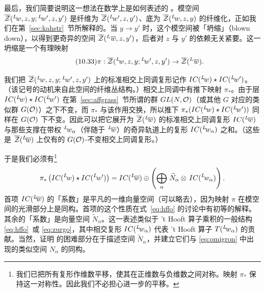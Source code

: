 最后，我们简要说明这一想法在数学上是如何表述的 \cite{ref97,ref98}。模空间 $\bar\EUZ({}^L\negthinspace w,z,y;{}^L\negthinspace w',z,y')$ 是纤维为 $\bar\EUZ ({}^L\negthinspace w',z,y')$、底为 $\bar\EUZ({}^L\negthinspace w,z,y)$ 的纤维化，正如我们在第~\ref{sec:kahstr}~节所解释的。当 $y\to y'$ 时，这个模空间被「坍缩」（blown down），以得到更奇异的空间 $\bar\EUZ({}^L\negthinspace\,\bar w,z,y')$，后者对 $z$ 与 $y'$ 的依赖无关紧要。这一坍缩是一个有理映射
\begin{equation*}
\tag*{(10.33)}
\pi:\bar\EUZ({}^L\negthinspace w,z,y;{}^L\negthinspace
w',z,y')\to \bar\EUZ({}^L\negthinspace\,\bar w).
\end{equation*}

我们把 $\bar\EUZ({}^L\negthinspace w,z,y;{}^L\negthinspace w',z,y')$ 上的标准相交上同调复形记作 $IC({}^L\negthinspace w)\star IC({}^L\negthinspace w')$。（该记号的动机来自此空间的纤维丛结构。）相交上同调中有推下映射 $\pi_*$。由于层 $IC({}^L\negthinspace w)\star IC({}^L\negthinspace w')$ 在第~\ref{sec:affgrass}~节所谓的群 $GL(N,{\cal O})$（或其他 $G$ 对应的类似群 $G({\cal O})$）之下不变，而 $\pi_*$ 与该作用交换，所以推下 $\pi_*(IC({}^L\negthinspace w)\star IC({}^L\negthinspace w'))$ 同样在 $G({\cal O})$ 下不变。因此可以把它展开为 $\bar\EUZ({}^L\negthinspace\bar w)$ 的标准相交上同调复形 $IC({}^L\negthinspace\bar w)$ 与那些支撑在带权 $^L\negthinspace w_\alpha$（伴随于 $^L\negthinspace\bar w$）的奇异轨道上的复形 $IC({}^L\negthinspace w_\alpha)$ 之和。（这些是 $\bar\EUZ({}^L\negthinspace\bar w)$ 上仅有的 $G({\cal O})$-不变相交上同调复形。）

于是我们必须有\footnote{我们已把所有复形作维数平移，使其在正维数与负维数之间对称。映射 $\pi_*$ 保持这一对称性。因此我们不必担心进一步的平移。}
\setcounter{equation}{33}
\begin{equation}\label{eq:yrox}
\pi_*\left(IC({}^L\negthinspace w)\star
IC({}^L\negthinspace w')\right)=IC({}^L\negthinspace\bar
w)\oplus \left(\bigoplus_\alpha\, \tilde N_\alpha \otimes \,IC({}^L\negthinspace w_\alpha)\right).
\end{equation}
 首项 $IC({}^L\negthinspace\bar w)$ 的「系数」是平凡的一维向量空间（可以略去），因为映射 $\pi$ 在模空间的光滑部分上是同构。首项的这个性质在式~\eqref{eq:hffo} 的讨论中有初等的解释。其余的「系数」是向量空间 $\tilde N_\alpha$。这一表述类似于 't Hooft 算子乘积的一般结构 \eqref{eq:hffo}\ 或 \eqref{eq:zurgo}，其中相交复形 $IC({}^L\negthinspace w_\alpha)$ 代表 't Hooft 算子 $T({}^L\negthinspace w_\alpha)$ 的贡献。当然，证明 \cite{ref97,ref98} 的困难部分在于描述空间 $\tilde N_\alpha$，并建立它们与 \eqref{eq:omigron} 中出现的类似空间 $N_\alpha$ 的同构。

